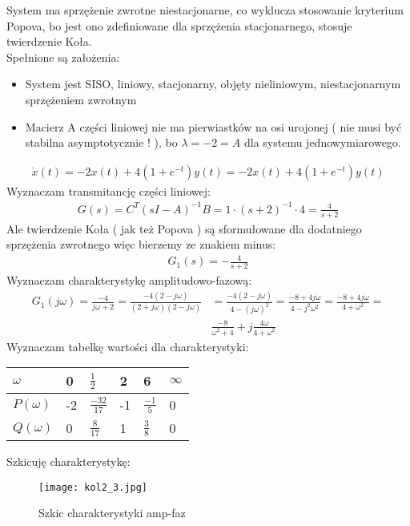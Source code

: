 \documentclass[a4paper,11pt]{article}
\begin{document}
System ma sprzężenie zwrotne niestacjonarne, co wyklucza stosowanie kryterium Popova, bo jest ono zdefiniowane dla sprzężenia stacjonarnego, stosuje twierdzenie Koła. \\
Spełnione są założenia:
\begin{itemize}
\item System jest SISO, liniowy, stacjonarny, objęty nieliniowym, niestacjonarnym sprzężeniem zwrotnym
\item Macierz A części liniowej nie ma pierwiastków na osi urojonej ( nie musi być stabilna asymptotycznie ! ), bo \( \lambda = -2 = A \) dla systemu jednowymiarowego.
\end{itemize}
\begin{align*}
\dot{x}(t)=-2x(t)+4(1+e^{-t})y(t) = -2x(t)+4(1+e^{-t})y(t)
\end{align*}
Wyznaczam transmitancję części liniowej:
\begin{align*}
G(s)=C^{T}(sI-A)^{-1}B=1\cdot (s+2)^{-1} \cdot 4 = \frac{4}{s+2}
\end{align*}
Ale twierdzenie Koła ( jak też Popova ) są sformułowane dla dodatniego sprzężenia zwrotnego więc bierzemy ze znakiem minus:
\begin{align*}
G_{1}(s)=-\frac{4}{s+2}
\end{align*}
Wyznaczam charakterystykę amplitudowo-fazową:
\begin{align*}
G_{1}(j\omega)=\frac{-4}{j\omega+2}=\frac{-4(2-j\omega)}{(2+j\omega)(2-j\omega)}&=
\frac{-4(2-j\omega)}{4-(j\omega)^{2}} = \frac{-8+4j\omega}{4-j^{2}\omega^{2}}=\frac{-8+4j\omega}{4+\omega^{2}} = \\
& \frac{-8}{\omega^{2}+4}+j\frac{4\omega}{4+\omega^{2}}
\end{align*}
Wyznaczam tabelkę wartości dla charakterystyki:
\begin{table}[H]
\begin{center}
\begin{tabular}{|p{2cm}|p{2cm}|p{2cm}|p{2cm}|p{2cm}|p{2cm}|}
\hline
\( \omega \) & 0 & \( \frac{1}{2} \) & 2 & 6 & \( \infty\)  \\ \hline
\( P(\omega) \) & -2 & \( \frac{-32}{17} \) & -1 & \( \frac{-1}{5} \) & 0  \\ \hline
\( Q(\omega) \) & 0 & \( \frac{8}{17} \) & 1 & \( \frac{3}{8} \) & 0  \\ \hline
\end{tabular}
\end{center}
\end{table}
Szkicuję charakterystykę:
\begin{figure}[H]
\centerline{\texttt{[image: kol2\_3.jpg]}}
\caption{Szkic charakterystyki amp-faz}
\label{fig:kol2_3}
\end{figure}
\end{document}
